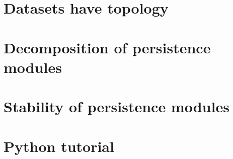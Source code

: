 \documentclass[a4paper,11pt]{article}
\theoremstyle{mytheor}
\theoremstyle{mytheor}
\theoremstyle{remark}
\begin{document}


\newpage

\section{Datasets have topology}



\newpage

\section{Decomposition of persistence modules}



\newpage

\section{Stability of persistence modules}



\section{Python tutorial}


\end{document}
